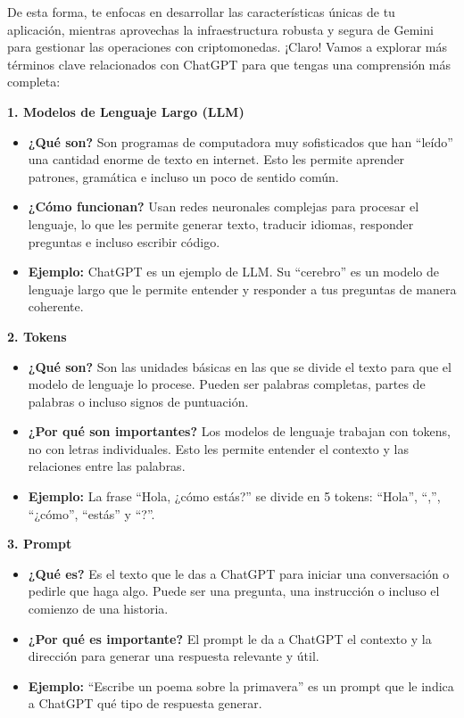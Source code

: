 \documentclass[
  10pt,
  letterpaper,
]{book}
\providecommand{\tightlist}{%
  \setlength{\itemsep}{0pt}\setlength{\parskip}{0pt}}\usepackage{longtable,booktabs,array}
\begin{document}
De esta forma, te enfocas en desarrollar las características únicas de
tu aplicación, mientras aprovechas la infraestructura robusta y segura
de Gemini para gestionar las operaciones con criptomonedas. ¡Claro!
Vamos a explorar más términos clave relacionados con ChatGPT para que
tengas una comprensión más completa:

\textbf{1. Modelos de Lenguaje Largo (LLM)}

\begin{itemize}
\tightlist
\item
  \textbf{¿Qué son?} Son programas de computadora muy sofisticados que
  han ``leído'' una cantidad enorme de texto en internet. Esto les
  permite aprender patrones, gramática e incluso un poco de sentido
  común.
\item
  \textbf{¿Cómo funcionan?} Usan redes neuronales complejas para
  procesar el lenguaje, lo que les permite generar texto, traducir
  idiomas, responder preguntas e incluso escribir código.
\item
  \textbf{Ejemplo:} ChatGPT es un ejemplo de LLM. Su ``cerebro'' es un
  modelo de lenguaje largo que le permite entender y responder a tus
  preguntas de manera coherente.
\end{itemize}

\textbf{2. Tokens}

\begin{itemize}
\tightlist
\item
  \textbf{¿Qué son?} Son las unidades básicas en las que se divide el
  texto para que el modelo de lenguaje lo procese. Pueden ser palabras
  completas, partes de palabras o incluso signos de puntuación.
\item
  \textbf{¿Por qué son importantes?} Los modelos de lenguaje trabajan
  con tokens, no con letras individuales. Esto les permite entender el
  contexto y las relaciones entre las palabras.
\item
  \textbf{Ejemplo:} La frase ``Hola, ¿cómo estás?'' se divide en 5
  tokens: ``Hola'', ``,'', ``¿cómo'', ``estás'' y ``?''.
\end{itemize}

\textbf{3. Prompt}

\begin{itemize}
\tightlist
\item
  \textbf{¿Qué es?} Es el texto que le das a ChatGPT para iniciar una
  conversación o pedirle que haga algo. Puede ser una pregunta, una
  instrucción o incluso el comienzo de una historia.
\item
  \textbf{¿Por qué es importante?} El prompt le da a ChatGPT el contexto
  y la dirección para generar una respuesta relevante y útil.
\item
  \textbf{Ejemplo:} ``Escribe un poema sobre la primavera'' es un prompt
  que le indica a ChatGPT qué tipo de respuesta generar.
\end{itemize}
\end{document}
